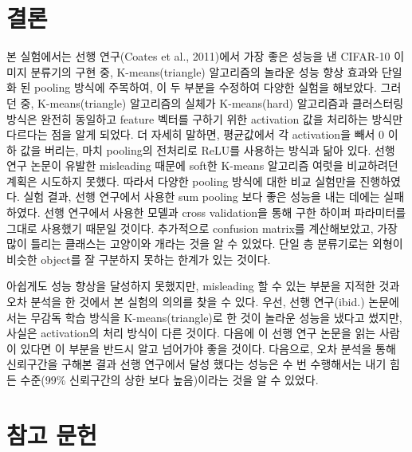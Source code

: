 \documentclass[a4paper,9pt]{article}
\begin{document}
\begin{multicols*}{2}
\section{결론}

본 실험에서는 선행 연구(Coates et al., 2011)에서 가장 좋은 성능을 낸 CIFAR-10 이미지 분류기의 구현 중, K-means(triangle) 알고리즘의 놀라운 성능 향상 효과와 단일화 된 pooling 방식에 주목하여, 이 두 부분을 수정하여 다양한 실험을 해보았다.
그러던 중, K-means(triangle) 알고리즘의 실체가 K-means(hard) 알고리즘과 클러스터링 방식은 완전히 동일하고 feature 벡터를 구하기 위한 activation 값을 처리하는 방식만 다르다는 점을 알게 되었다.
더 자세히 말하면, 평균값에서 각 activation을 빼서 0 이하 값을 버리는, 마치 pooling의 전처리로 ReLU를 사용하는 방식과 닮아 있다.
선행 연구 논문이 유발한 misleading 때문에 soft한 K-means 알고리즘 여럿을 비교하려던 계획은 시도하지 못했다.
따라서 다양한 pooling 방식에 대한 비교 실험만을 진행하였다.
실험 결과, 선행 연구에서 사용한 sum pooling 보다 좋은 성능을 내는 데에는 실패하였다.
선행 연구에서 사용한 모델과 cross validation을 통해 구한 하이퍼 파라미터를 그대로 사용했기 때문일 것이다.
추가적으로 confusion matrix를 계산해보았고, 가장 많이 틀리는 클래스는 고양이와 개라는 것을 알 수 있었다.
단일 층 분류기로는 외형이 비슷한 object를 잘 구분하지 못하는 한계가 있는 것이다.

아쉽게도 성능 향상을 달성하지 못했지만, misleading 할 수 있는 부분을 지적한 것과 오차 분석을 한 것에서 본 실험의 의의를 찾을 수 있다.
우선, 선행 연구(ibid.) 논문에서는 무감독 학습 방식을 K-means(triangle)로 한 것이 놀라운 성능을 냈다고 썼지만, 사실은 activation의 처리 방식이 다른 것이다.
다음에 이 선행 연구 논문을 읽는 사람이 있다면 이 부분을 반드시 알고 넘어가야 좋을 것이다.
다음으로, 오차 분석을 통해 신뢰구간을 구해본 결과 선행 연구에서 달성 했다는 성능은 수 번 수행해서는 내기 힘든 수준(99\% 신뢰구간의 상한 보다 높음)이라는 것을 알 수 있었다.


\section*{참고 문헌}


\end{multicols*}
\end{document}
